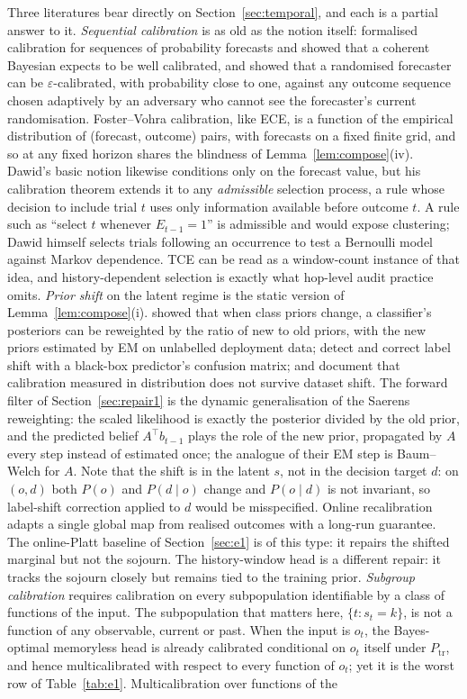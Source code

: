 \documentclass[11pt,a4paper]{article}
\numberwithin{equation}{section}
\theoremstyle{plain}
\theoremstyle{definition}
\theoremstyle{remark}
\newcommand{\ptrain}{P_{\mathrm{tr}}}
\begin{document}
Three literatures bear directly on Section~\ref{sec:temporal}, and each is a partial answer to it. \emph{Sequential calibration} is as old as the notion itself: \citet{dawid1982} formalised calibration for sequences of probability forecasts and showed that a coherent Bayesian expects to be well calibrated, and \citet{foster1998} showed that a randomised forecaster can be $\varepsilon$-calibrated, with probability close to one, against any outcome sequence chosen adaptively by an adversary who cannot see the forecaster's current randomisation. Foster--Vohra calibration, like ECE, is a function of the empirical distribution of (forecast, outcome) pairs, with forecasts on a fixed finite grid, and so at any fixed horizon shares the blindness of Lemma~\ref{lem:compose}(iv). Dawid's basic notion likewise conditions only on the forecast value, but his calibration theorem extends it to any \emph{admissible} selection process, a rule whose decision to include trial $t$ uses only information available before outcome $t$. A rule such as ``select $t$ whenever $E_{t-1}=1$'' is admissible and would expose clustering; Dawid himself selects trials following an occurrence to test a Bernoulli model against Markov dependence. TCE can be read as a window-count instance of that idea, and history-dependent selection is exactly what hop-level audit practice omits. \emph{Prior shift} on the latent regime is the static version of Lemma~\ref{lem:compose}(i). \citet{saerens2002} showed that when class priors change, a classifier's posteriors can be reweighted by the ratio of new to old priors, with the new priors estimated by EM on unlabelled deployment data; \citet{lipton2018} detect and correct label shift with a black-box predictor's confusion matrix; and \citet{ovadia2019} document that calibration measured in distribution does not survive dataset shift. The forward filter of Section~\ref{sec:repair1} is the dynamic generalisation of the Saerens reweighting: the scaled likelihood is exactly the posterior divided by the old prior, and the predicted belief $A^\top b_{t-1}$ plays the role of the new prior, propagated by $A$ every step instead of estimated once; the analogue of their EM step is Baum--Welch for $A$. Note that the shift is in the latent $s$, not in the decision target $d$: on $(o,d)$ both $P(o)$ and $P(d\mid o)$ change and $P(o\mid d)$ is not invariant, so label-shift correction applied to $d$ would be misspecified. Online recalibration \citep{gibbs2021} adapts a single global map from realised outcomes with a long-run guarantee. The online-Platt baseline of Section~\ref{sec:e1} is of this type: it repairs the shifted marginal but not the sojourn. The history-window head is a different repair: it tracks the sojourn closely but remains tied to the training prior. \emph{Subgroup calibration} \citep{hebertjohnson2018} requires calibration on every subpopulation identifiable by a class of functions of the input. The subpopulation that matters here, $\{t: s_t=k\}$, is not a function of any observable, current or past. When the input is $o_t$, the Bayes-optimal memoryless head is already calibrated conditional on $o_t$ itself under $\ptrain$, and hence multicalibrated with respect to every function of $o_t$; yet it is the worst row of Table~\ref{tab:e1}. Multicalibration over functions of the 
\end{document}
